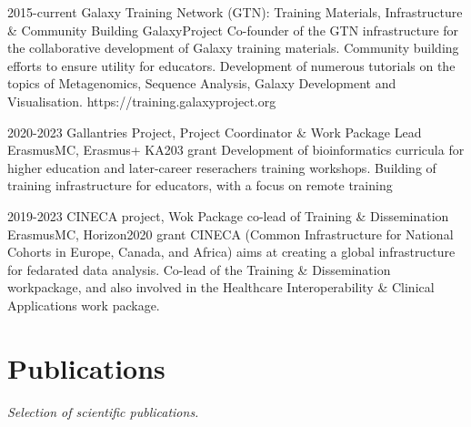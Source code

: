 \documentclass[]{shiltemann-cv}
\begin{document}
\begin{entrylist}
    \entry
    {2015-current}
    {Galaxy Training Network (GTN): Training Materials, Infrastructure \& Community Building}
    {GalaxyProject}
    {Co-founder of the GTN infrastructure for the collaborative development of Galaxy training materials. Community building efforts to ensure utility for educators.  Development of numerous tutorials on the topics of Metagenomics, Sequence Analysis, Galaxy Development and Visualisation. https://training.galaxyproject.org }

\end{entrylist}
\begin{entrylist}

   \entry
    {2020-2023}
    {Gallantries Project, Project Coordinator \& Work Package Lead}
    {ErasmusMC, Erasmus+ KA203 grant}
    {Development of bioinformatics curricula for higher education and later-career reserachers training workshops. Building of training infrastructure for educators, with a focus on remote training}

\end{entrylist}
\begin{entrylist}

   \entry
    {2019-2023}
    {CINECA project, Wok Package co-lead of Training \& Dissemination}
    {ErasmusMC, Horizon2020 grant}
    {CINECA (Common Infrastructure for National Cohorts in Europe, Canada, and Africa) aims at creating a global infrastructure for fedarated data analysis. Co-lead of the Training \& Dissemination  workpackage, and also involved in the Healthcare Interoperability \& Clinical Applications work package.}
 \end{entrylist}





\section{Publications}
\emph{Selection of scientific publications.}
\end{document}
